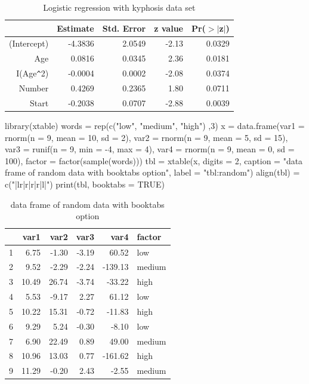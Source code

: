 \documentclass{memoir}\usepackage[]{graphicx}\usepackage[]{color}
\begin{document}
\begin{table}[ht]
\centering
\begin{tabular}{rrrrr}
  \hline
 & Estimate & Std. Error & z value & Pr($>$$|$z$|$) \\ 
  \hline
(Intercept) & -4.3836 & 2.0549 & -2.13 & 0.0329 \\ 
  Age & 0.0816 & 0.0345 & 2.36 & 0.0181 \\ 
  I(Age\verb|^|2) & -0.0004 & 0.0002 & -2.08 & 0.0374 \\ 
  Number & 0.4269 & 0.2365 & 1.80 & 0.0711 \\ 
  Start & -0.2038 & 0.0707 & -2.88 & 0.0039 \\ 
   \hline
\end{tabular}
\caption{Logistic regression with kyphosis data set} 
\label{tbl:logistic}
\end{table}



\begin{codelisting}[caption={random data table input},language=R]
library(xtable)
words = rep(c("low", "medium", "high") ,3)
x = data.frame(var1 = rnorm(n = 9, mean = 10, sd = 2),
  	var2 = rnorm(n = 9, mean = 5, sd = 15),
		var3 = runif(n = 9, min = -4, max = 4),
		var4 = rnorm(n = 9, mean = 0, sd = 100),
		factor = factor(sample(words)))
tbl = xtable(x, digits = 2, 
  caption = "data frame of random data with booktabs option",
  label = "tbl:random")
align(tbl) = c("|lr|r|r|r|l|")
print(tbl, booktabs = TRUE)
\end{codelisting}

\begin{table}[ht]
\centering
\begin{tabular}{|lr|r|r|r|l|}
  \toprule
 & var1 & var2 & var3 & var4 & factor \\ 
  \midrule
1 & 6.75 & -1.30 & -3.19 & 60.52 & low \\ 
  2 & 9.52 & -2.29 & -2.24 & -139.13 & medium \\ 
  3 & 10.49 & 26.74 & -3.74 & -33.22 & high \\ 
  4 & 5.53 & -9.17 & 2.27 & 61.12 & low \\ 
  5 & 10.22 & 15.31 & -0.72 & -11.83 & high \\ 
  6 & 9.29 & 5.24 & -0.30 & -8.10 & low \\ 
  7 & 6.90 & 22.49 & 0.89 & 49.00 & medium \\ 
  8 & 10.96 & 13.03 & 0.77 & -161.62 & high \\ 
  9 & 11.29 & -0.20 & 2.43 & -2.55 & medium \\ 
   \bottomrule
\end{tabular}
\caption{data frame of random data with booktabs option} 
\label{tbl:random}
\end{table}
\end{document}
